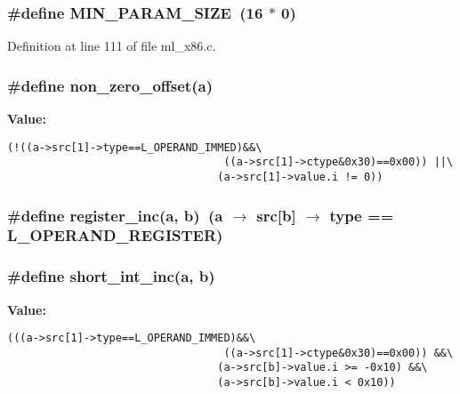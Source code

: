 \subsubsection{\setlength{\rightskip}{0pt plus 5cm}\#define MIN\_\-PARAM\_\-SIZE~(16 $\ast$ 0)}\label{ml__x86_8c_48f1f5d33d6770a468f7767465e07abb}




Definition at line 111 of file ml\_\-x86.c.
\subsubsection{\setlength{\rightskip}{0pt plus 5cm}\#define non\_\-zero\_\-offset(a)}\label{ml__x86_8c_1a7d03fa0a676d3b09e555d8c8176f1b}


\textbf{Value:}

\begin{Code}\begin{verbatim}(!((a->src[1]->type==L_OPERAND_IMMED)&&\
                                  ((a->src[1]->ctype&0x30)==0x00)) ||\
                                 (a->src[1]->value.i != 0))
\end{verbatim}\end{Code}
\subsubsection{\setlength{\rightskip}{0pt plus 5cm}\#define register\_\-inc(a, b)~(a $\rightarrow$ src[b] $\rightarrow$ type == L\_\-OPERAND\_\-REGISTER)}\label{ml__x86_8c_1e7b7d7ff33cab42b74ae66e888b1124}


\subsubsection{\setlength{\rightskip}{0pt plus 5cm}\#define short\_\-int\_\-inc(a, b)}\label{ml__x86_8c_beca719e984ec0dc73106055269cd986}


\textbf{Value:}

\begin{Code}\begin{verbatim}(((a->src[1]->type==L_OPERAND_IMMED)&&\
                                  ((a->src[1]->ctype&0x30)==0x00)) &&\
                                 (a->src[b]->value.i >= -0x10) &&\
                                 (a->src[b]->value.i < 0x10))
\end{verbatim}\end{Code}


